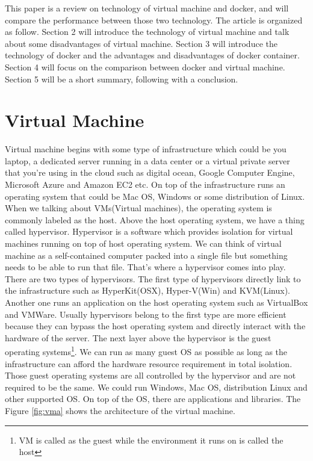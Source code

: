 \documentclass{sig-alternate}
\begin{document}
This paper is a review on technology of virtual machine and docker, and will compare the performance between those two technology. The article is organized as follow. Section 2 will introduce the technology of virtual machine and talk about some disadvantages of virtual machine. Section 3 will introduce the technology of docker and the advantages and disadvantages of docker container. Section 4 will focus on the comparison between docker and virtual machine. Section 5 will be a short summary, following with a conclusion. 

\section{Virtual Machine}
Virtual machine begins with some type of infrastructure which could be you laptop, a dedicated server running in a data center or a virtual private server that you're using in the cloud such as digital ocean, Google Computer Engine, Microsoft Azure and Amazon EC2 etc. On top of the infrastructure runs an operating system that could be Mac OS, Windows or some distribution of Linux. When we talking about VMs(Virtual machines), the operating system is commonly labeled as the host. Above the host operating system, we have a thing called hypervisor. Hypervisor is a software which provides isolation for virtual machines running on top of host operating system. We can think of virtual machine as a self-contained computer packed into a single file but something needs to be able to run that file. That's where a hypervisor comes into play. There are two types of hypervisors. The first type of hypervisors directly link to the infrastructure such as HyperKit(OSX), Hyper-V(Win) and KVM(Linux). Another one runs an application on the host operating system such as VirtualBox and VMWare. Usually hypervisors belong to the first type are more efficient because they can bypass the host operating system and directly interact with the hardware of the server. The next layer above the hypervisor is the guest operating systems\footnote{VM is called as the guest while the environment it runs on is called the host}. We can run as many guest OS as possible as long as the infrastructure can afford the hardware resource requirement in total isolation. Those guest operating systems are all controlled by the hypervisor and are not required to be the same. We could run Windows, Mac OS, distribution Linux and other supported OS.  On top of the OS, there are applications and libraries. The Figure \ref{fig:vma} shows the architecture of the virtual machine. 
\end{document}

